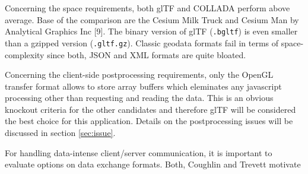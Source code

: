       Concerning the space requirements, both glTF and COLLADA perform above average. Base of the comparison are the Cesium Milk Truck and Cesium Man by Analytical Graphics Inc [9]. The binary version of glTF (\texttt{.bgltf}) is even smaller than a gzipped version (\texttt{.gltf.gz}). Classic geodata formats fail in terms of space-complexity since both, JSON and XML formats are quite bloated.\par
      Concerning the client-side postprocessing requirements, only the OpenGL transfer format allows to store array buffers which eleminates any javascript processing other than requesting and reading the data. This is an obvious knockout criteria for the other candidates and therefore glTF will be considered the best choice for this application. Details on the postprocessing issues will be discussed in section \ref{sec:issue}.\par
      For handling data-intense client/server communication, it is important to
      evaluate options on data exchange formats. Both, Coughlin and Trevett motivate
